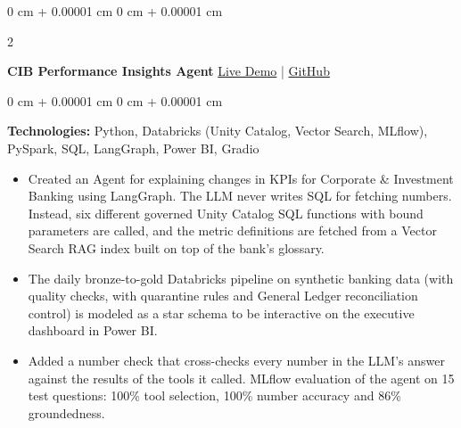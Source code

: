 \documentclass[10pt, letterpaper]{article}
\newenvironment{highlights}{
    \begin{itemize}[
        topsep=0.10 cm,
        parsep=0.10 cm,
        partopsep=0pt,
        itemsep=0pt,
        leftmargin=0 cm + 10pt
    ]
}{
    \end{itemize}
} %
\newenvironment{onecolentry}{
    \begin{adjustwidth}{
        0 cm + 0.00001 cm
    }{
        0 cm + 0.00001 cm
    }
}{
    \end{adjustwidth}
} %
\newenvironment{twocolentry}[2][]{
    \onecolentry
    \def\secondColumn{#2}
    \setcolumnwidth{\fill, 4.5 cm}
    \begin{paracol}{2}
}{
    \switchcolumn \raggedleft \secondColumn
    \end{paracol}
    \endonecolentry
} %
\begin{document}
        \begin{twocolentry}{
            \href{https://insights.inkandinfra.com}{Live Demo} |
            \href{https://github.com/hpk369/northlake-cib-insights-agent}{GitHub}
        }
            \textbf{CIB Performance Insights Agent}\end{twocolentry}
        \vspace{0.10 cm}
        \begin{onecolentry}
            \textbf{Technologies:}\> Python, Databricks (Unity Catalog, Vector Search, MLflow), PySpark, SQL, LangGraph, Power BI, Gradio
            \begin{highlights}
                \item Created an Agent for explaining changes in KPIs for Corporate \& Investment Banking using LangGraph. The LLM never writes SQL for fetching numbers. Instead, six different governed Unity Catalog SQL functions with bound parameters are called, and the metric definitions are fetched from a Vector Search RAG index built on top of the bank’s glossary.
                \item The daily bronze-to-gold Databricks pipeline on synthetic banking data (with quality checks, with quarantine rules and General Ledger reconciliation control) is modeled as a star schema to be interactive on the executive dashboard in Power BI.
                \item Added a number check that cross-checks every number in the LLM’s answer against the results of the tools it called. MLflow evaluation of the agent on 15 test questions: 100\% tool selection, 100\% number accuracy and 86\% groundedness.
            \end{highlights}
        \end{onecolentry}
\end{document}

